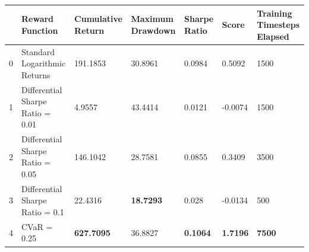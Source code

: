 \begin{tabular}{lllllll}
\toprule
 & Reward Function & Cumulative Return & Maximum Drawdown & Sharpe Ratio & Score & Training Timesteps Elapsed \\
\midrule
0 & Standard Logarithmic Returns & 191.1853 & 30.8961 & 0.0984 & 0.5092 & 1500 \\
1 & Differential Sharpe Ratio = 0.01 & 4.9557 & 43.4414 & 0.0121 & -0.0074 & 1500 \\
2 & Differential Sharpe Ratio = 0.05 & 146.1042 & 28.7581 & 0.0855 & 0.3409 & 3500 \\
3 & Differential Sharpe Ratio = 0.1 & 22.4316 & \textbf{18.7293} & 0.028 & -0.0134 & 500 \\
4 & CVaR = 0.25 & \textbf{627.7095} & 36.8827 & \textbf{0.1064} & \textbf{1.7196} & \textbf{7500} \\
\bottomrule
\end{tabular}
